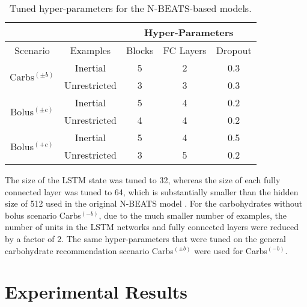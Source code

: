 \begin{table}[ht]
\caption{Tuned hyper-parameters for the N-BEATS-based models.}
\label{tab:hyper-nbeats}
\begin{center}
\small
\begin{tabular}{|c|c|c|c|c|}
\cline{3-5}
\multicolumn{2}{l}{} & \multicolumn{3}{|c|}{Hyper-Parameters}\\
\hline
Scenario & Examples & Blocks & FC Layers & Dropout\\
\hline
\multirow{2}{*}{Carbs$^{(\pm b)}$} & Inertial & 5 & 2 & 0.3\\
& Unrestricted & 3 & 3 & 0.3\\
\hline
\multirow{2}{*}{Bolus$^{(\pm c)}$} & Inertial & 5 & 4 & 0.2\\
& Unrestricted & 4 & 4 & 0.2\\
\hline
\multirow{2}{*}{Bolus$^{(+c)}$} & Inertial & 5 & 4 & 0.5\\
& Unrestricted & 3 & 5 & 0.2\\
\hline
\end{tabular}
\end{center}
\end{table}


The size of the \ac{LSTM} state was tuned to 32, whereas the size of each fully connected layer was tuned to 64, which is substantially smaller than the hidden size of 512 used in the original \ac{N-BEATS} model \cite{oreshkin:nbeats}. For the carbohydrates without bolus scenario Carbs$^{(-b)}$, due to the much smaller number of examples, the number of units in the \ac{LSTM} networks and fully connected layers were reduced by a factor of 2. The same hyper-parameters that were tuned on the general carbohydrate recommendation scenario Carbs$^{(\pm b)}$ were used for Carbs$^{(-b)}$.

\section{Experimental Results}
\label{sec:results}


